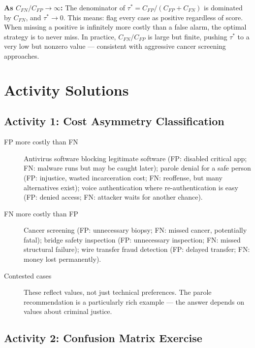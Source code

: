 \textbf{As $C_{FN}/C_{FP} \to \infty$:} The denominator of $\tau^* = C_{FP}/(C_{FP} + C_{FN})$ is dominated by $C_{FN}$, and $\tau^* \to 0$. This means: flag every case as positive regardless of score. When missing a positive is infinitely more costly than a false alarm, the optimal strategy is to never miss. In practice, $C_{FN}/C_{FP}$ is large but finite, pushing $\tau^*$ to a very low but nonzero value --- consistent with aggressive cancer screening approaches.

\section{Activity Solutions}

\subsection{Activity 1: Cost Asymmetry Classification}

\begin{description}
    \item[FP more costly than FN] Antivirus software blocking legitimate software (FP: disabled critical app; FN: malware runs but may be caught later); parole denial for a safe person (FP: injustice, wasted incarceration cost; FN: reoffense, but many alternatives exist); voice authentication where re-authentication is easy (FP: denied access; FN: attacker waits for another chance).

    \item[FN more costly than FP] Cancer screening (FP: unnecessary biopsy; FN: missed cancer, potentially fatal); bridge safety inspection (FP: unnecessary inspection; FN: missed structural failure); wire transfer fraud detection (FP: delayed transfer; FN: money lost permanently).

    \item[Contested cases] These reflect values, not just technical preferences. The parole recommendation is a particularly rich example --- the answer depends on values about criminal justice.
\end{description}

\subsection{Activity 2: Confusion Matrix Exercise}

